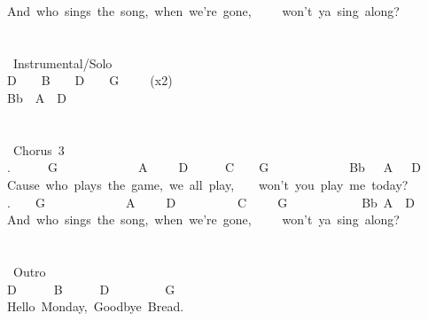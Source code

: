{And\ who\ sings\ the\ song,\ when\ we're\ gone,\ \ \ \ \ won't\ ya\ sing\ along?\\
\\
\\
\lbrack\ Instrumental/Solo\rbrack\\
D\ \ \ \ B\ \ \ \ D\ \ \ \ G\ \ \ \ \ (x2)\\
Bb\ \ A\ \ D\ \\
\\
\\
\lbrack\ Chorus\ 3\rbrack\\
.\ \ \ \ \ \ G\ \ \ \ \ \ \ \ \ \ \ \ \ A\ \ \ \ \ D\ \ \ \ \ \ C\ \ \ \ G\ \ \ \ \ \ \ \ \ \ \ \ \ Bb\ \ \ A\ \ \ D\ \ \ \ \\
Cause\ who\ plays\ the\ game,\ we\ all\ play,\ \ \ \ won't\ you\ play\ me\ today?\\
.\ \ \ \ G\ \ \ \ \ \ \ \ \ \ \ \ \ A\ \ \ \ \ D\ \ \ \ \ \ \ \ \ \ C\ \ \ \ \ G\ \ \ \ \ \ \ \ \ \ \ \ Bb\ A\ \ D\\
And\ who\ sings\ the\ song,\ when\ we're\ gone,\ \ \ \ \ won't\ ya\ sing\ along?\ \\
\\
\\
\lbrack\ Outro\rbrack\\
D\ \ \ \ \ \ B\ \ \ \ \ \ D\ \ \ \ \ \ \ \ \ G\\
Hello\ Monday,\ Goodbye\ Bread.}
